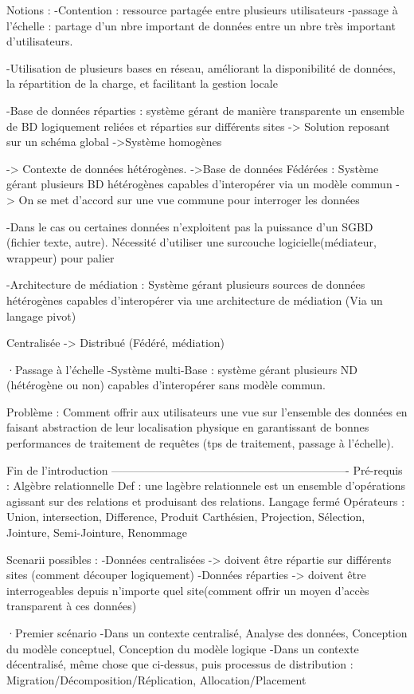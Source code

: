 Notions :
-Contention : ressource partagée entre plusieurs utilisateurs
-passage à l'échelle : partage d'un nbre important de données entre un nbre très important d'utilisateurs.

-Utilisation de plusieurs bases en réseau, améliorant la disponibilité de données, la répartition de la charge, et facilitant la gestion locale

-Base de données réparties : système gérant de manière transparente un ensemble de BD logiquement reliées et réparties sur différents sites -> Solution reposant sur un schéma global
	->Système homogènes

-> Contexte de données hétérogènes.
	->Base de données Fédérées : Système gérant plusieurs BD hétérogènes capables d'interopérer via un modèle commun -> On se met d'accord sur une vue commune pour interroger les données

	-Dans le cas ou certaines données n'exploitent pas la puissance d'un SGBD (fichier texte, autre). Nécessité d'utiliser une surcouche logicielle(médiateur, wrappeur) pour palier

-Architecture de médiation : Système gérant plusieurs sources de données hétérogènes capables d'interopérer via une architecture de médiation (Via un langage pivot)

Centralisée -> Distribué (Fédéré, médiation)


·Passage à l'échelle
-Système multi-Base : système gérant plusieurs ND (hétérogène ou non) capables d'interopérer sans modèle commun.


Problème : Comment offrir aux utilisateurs une vue sur l'ensemble des données en faisant abstraction de leur localisation physique en garantissant de bonnes performances de traitement de requêtes (tps de traitement, passage à l'échelle).

Fin de l'introduction
----------------------------------------------------------------
Pré-requis : Algèbre relationnelle
	Def : une lagèbre relationnele est un ensemble d'opérations agissant sur des relations et produisant des relations. Langage fermé
	Opérateurs : Union, intersection, Difference, Produit Carthésien, Projection, Sélection, Jointure, Semi-Jointure, Renommage


Scenarii possibles :
-Données centralisées -> doivent être répartie sur différents sites (comment découper logiquement)
-Données réparties -> doivent être interrogeables depuis n'importe quel site(comment offrir un moyen d'accès transparent à ces données)

·Premier scénario
	-Dans un contexte centralisé, Analyse des données, Conception du modèle conceptuel, Conception du modèle logique
	-Dans un contexte décentralisé, même chose que ci-dessus, puis processus de distribution : Migration/Décomposition/Réplication, Allocation/Placement

